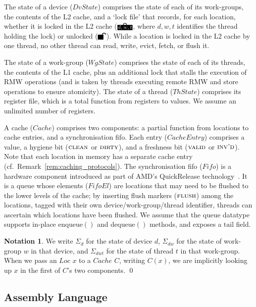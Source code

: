 \documentclass[svgnames,10pt]{sigplanconf}
\theoremstyle{definition}
\newtheorem*{notation}{Notation}
\newenvironment{Notation}{\begin{notation}}{\qed\end{notation}}
\newcommand\padlock[1]{\begin{tikzpicture}[baseline=(n.base), yscale=-1]
\node[draw=black, fill=black, text=white, inner sep=0.1ex, minimum width=1.5ex] (n) at (0,0) {\scriptsize\vphantom{d,}$#1$};
\draw [line width=0.2ex] ([xshift=-0.55ex]n.north) arc (-180:0:0.55ex);
\end{tikzpicture}}
\newcommand\unpadlock{\begin{tikzpicture}[baseline=(n.base), yscale=-1]
\node[draw=black, fill=black, text=white, inner sep=0.1ex] (n) at (0,0) {\scriptsize \phantom{d,}};
\draw [line width=0.2ex] ([xshift=0.55ex]n.north) arc (-180:0:0.55ex);
\end{tikzpicture}}
\newcommand\var[1]{\mathit{#1}}
\newcommand\DIRTY{\textsc{dirty}}
\newcommand\CLEAN{\textsc{clean}}
\newcommand\VALID{\textsc{valid}}
\newcommand\INVALID{\textsc{inv'd}}
\begin{document}
The state of a device ($\var{DvState}$) comprises the state of each of
its work-groups, the contents of the L2 cache, and a `lock file' that
records, for each location, whether it is locked in the L2 cache
($\padlock{d,w,t}$, where $d,w,t$ identifies the thread holding the
lock) or unlocked ($\unpadlock$). While a location is locked in the L2
cache by one thread, no other thread can read, write, evict, fetch, or
flush it.

The state of a work-group ($\var{WgState}$) comprises the state of
each of its threads, the contents of the L1 cache, plus an additional
lock that stalls the execution of RMW operations (and is taken by
threads executing remote RMW and store operations to ensure
atomicity). The state of a thread ($\var{ThState}$) comprises its
register file, which is a total function from registers to values. We
assume an unlimited number of registers.

A cache ($\var{Cache}$) comprises two components: a partial function
from locations to cache entries, and a synchronisation fifo. Each
entry ($\var{CacheEntry}$) comprises a value, a hygiene bit ($\CLEAN$
or $\DIRTY$), and a freshness bit ($\VALID$ or $\INVALID$). Note that
each location in memory has a separate cache entry
(cf.~Remark~\ref{rem:caching_protocols}). The synchronisation fifo
($\var{Fifo}$) is a hardware component introduced as part of AMD's
QuickRelease technology~\cite{hechtman+14}. It is a queue whose
elements ($\var{FifoEl}$) are locations that may need to be flushed to
the lower levels of the cache; by inserting flush markers
($\textsc{flush}$) among the locations, tagged with their own
device/work-group/thread identifier, threads can ascertain which
locations have been flushed. We assume that the $\mathrm{queue}$
datatype supports in-place $\mathrm{enqueue}()$ and
$\mathrm{dequeue}()$ methods, and exposes a $\mathrm{tail}$ field.

\begin{Notation} We write $\Sigma_{d}$ for
the state of device $d$, $\Sigma_{dw}$ for the state of work-group $w$
in that device, and $\Sigma_{dwt}$ for the state of thread $t$ in that
work-group. When we pass an $\var{Loc}$ $x$ to a $\var{Cache}$ $C$, writing $C(x)$, we are
implicitly looking up $x$ in the first of $C$'s two components.
\end{Notation}

\subsection{Assembly Language}
\label{sec:assembly_language}
\end{document}
